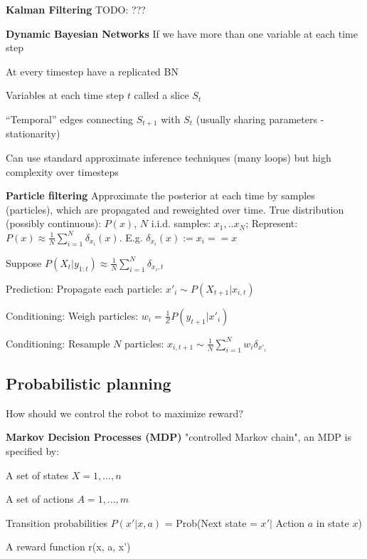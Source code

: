 \documentclass[a4paper, 11pt, landscape]{article}
\begin{document}
\begin{multicols*}{3}
\textbf{Kalman Filtering}
TODO: ???

\textbf{Dynamic Bayesian Networks}
If we have more than one variable at each time step
\begin{compactitem}
	\item At every timestep have a replicated BN
	\item Variables at each time step $t$ called a slice $S_t$
	\item “Temporal” edges connecting $S_{t+1}$ with $S_t$ (usually sharing parameters - stationarity)
	\item Can use standard approximate inference techniques (many loops) but high complexity over timesteps
\end{compactitem}


\textbf{Particle filtering}
Approximate the posterior at each time by samples (particles), which are propagated and reweighted over time.
True distribution (possibly continuous): $P(x)$, $N$ i.i.d. samples: $x_1,..x_N$; Represent: $P(x) \approx \frac{1}{N} \sum_{i=1}^{N} \delta_{x_i}(x)$. E.g. $\delta_{x_i}(x):= x_i == x$

\begin{compactitem}
	\item Suppose $P(X_t | y_{1:t}) \approx \frac{1}{N} \sum_{i=1}^{N} \delta_{x_i, t}$
	\item Prediction: Propagate each particle: $x'_i \sim P(X_{t+1} | x_{i,t})$
	\item Conditioning: Weigh particles: $w_i = \frac{1}{Z}P(y_{t+1} | x'_i)$
	\item Conditioning: Resample $N$ particles: $x_{i, t+1} \sim \frac{1}{N} \sum_{i=1}^{N} w_i\delta_{x'_i}$ 
\end{compactitem}

\subsection{Probabilistic planning}
How should we control the robot to maximize reward?

\textbf{Markov Decision Processes (MDP)}
"controlled Markov chain", an MDP is specified by:
\begin{compactitem}
	\item A set of states $X={1,...,n}$
	\item A set of actions $A={1,...,m}$
	\item Transition probabilities $P(x' | x, a)$ = Prob(Next state = $x' |$ Action $a$ in state $x$)
	\item A reward function r(x, a, x')
	

\end{compactitem}
\end{multicols*}
\end{document}
